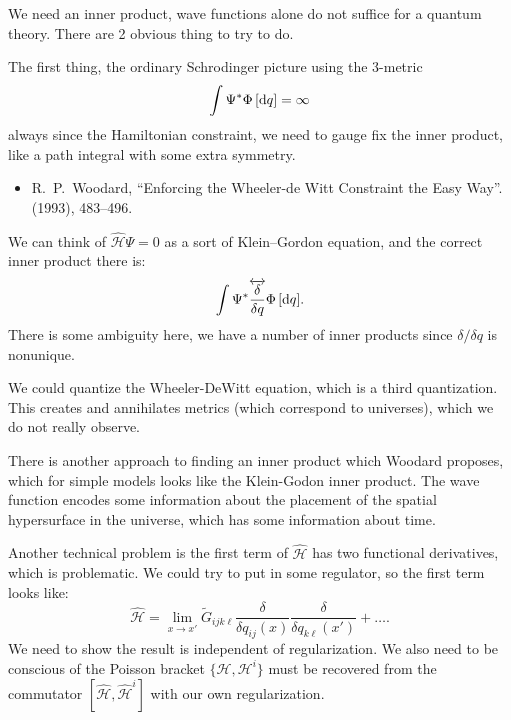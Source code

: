 We need an inner product, wave functions alone do not suffice for a
quantum theory. There are 2 obvious thing to try to do.

The first thing, the ordinary Schrodinger picture using the 3-metric
\begin{equation}
\int\Psi^{*}\Phi\,[\mathrm{d} q] = \infty
\end{equation}
always since the Hamiltonian constraint, we need to gauge fix the inner
product, like a path integral with some extra symmetry.

\begin{itemize}
\item R.~P.~Woodard,
``Enforcing the Wheeler-de Witt Constraint the Easy Way''.
  (1993), 483--496.\\
{\tt{}}
\end{itemize}

We can think of $\widehat{\mathcal{H}}\Psi=0$ as a sort of Klein--Gordon
equation, and the correct inner product there is:
\begin{equation}
\int\Psi^{*}\overleftrightarrow{\frac{\delta}{\delta q}}\Phi\,[\mathrm{d} q].
\end{equation}
There is some ambiguity here, we have a number of inner products since
$\delta/\delta q$ is nonunique.

We could quantize the Wheeler-DeWitt equation, which is a third
quantization. This creates and annihilates metrics (which correspond to
universes), which we do not really observe.

There is another approach to finding an inner product which Woodard
proposes, which for simple models looks like the Klein-Godon inner
product. The wave function encodes some information about the placement
of the spatial hypersurface in the universe, which has some information
about time.

Another technical problem is the first term of $\widehat{\mathcal{H}}$
has two functional derivatives, which is problematic. We could try to
put in some regulator, so the first term looks like:
\begin{equation}
\widehat{\mathcal{H}} = \lim_{x\to x'}\widetilde{G}_{ijk\ell}\frac{\delta}{\delta q_{ij}(x)}\frac{\delta}{\delta q_{k\ell}(x')}+\dots.
\end{equation}
We need to show the result is independent of regularization. We also
need to be conscious of the Poisson bracket
$\{\mathcal{H},\mathcal{H}^{i}\}$ must be recovered from the commutator
$[\widehat{\mathcal{H}},\widehat{\mathcal{H}}^{i}]$ with our own
regularization.

